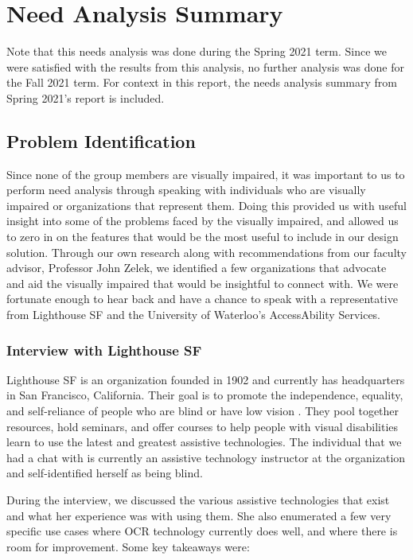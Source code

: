 \documentclass[a4paper,11pt]{article}
\begin{document}
\section{Need Analysis Summary}
Note that this needs analysis was done during the Spring 2021 term. Since we were satisfied with the results from this analysis, no further analysis was done for the Fall 2021 term. For context in this report, the needs analysis summary from Spring 2021's report is included.

\label{need-analysis-summary}

\subsection{Problem Identification}
Since none of the group members are visually impaired, it was important to us to perform need analysis through speaking with individuals who are visually impaired or organizations that represent them. Doing this provided us with useful insight into some of the problems faced by the visually impaired, and allowed us to zero in on the features that would be the most useful to include in our design solution. Through our own research along with recommendations from our faculty advisor, Professor John Zelek, we identified a few organizations that advocate and aid the visually impaired that would be insightful to connect with. We were fortunate enough to hear back and have a chance to speak with a representative from Lighthouse SF and the University of Waterloo's AccessAbility Services.

\subsubsection{Interview with Lighthouse SF}
Lighthouse SF is an organization founded in 1902 and currently has headquarters in San Francisco, California. Their goal is to promote the independence, equality, and self-reliance of people who are blind or have low vision \cite{lighthouse-sf-homepage}. They pool together resources, hold seminars, and offer courses to help people with visual disabilities learn to use the latest and greatest assistive technologies. The individual that we had a chat with is currently an assistive technology instructor at the organization and self-identified herself as being blind.

During the interview, we discussed the various assistive technologies that exist and what her experience was with using them. She also enumerated a few very specific use cases where OCR technology currently does well, and where there is room for improvement. Some key takeaways were:
\end{document}
